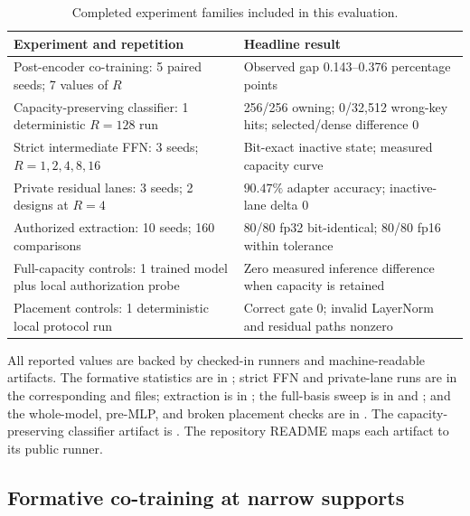 \documentclass[11pt]{article}
\begin{document}
\begin{table}[ht]
\centering
\caption{Completed experiment families included in this evaluation.}
\label{tab:evidence-map}
\small
\begin{tabularx}{\textwidth}{@{}p{}X@{}}
\toprule
Experiment and repetition & Headline result \\
\midrule
Post-encoder co-training: 5 paired seeds; 7 values of $R$ &
Observed gap 0.143--0.376 percentage points \\
Capacity-preserving classifier: 1 deterministic $R=128$ run &
256/256 owning; 0/32,512 wrong-key hits; selected/dense difference 0 \\
Strict intermediate FFN: 3 seeds; $R=1,2,4,8,16$ &
Bit-exact inactive state; measured capacity curve \\
Private residual lanes: 3 seeds; 2 designs at $R=4$ &
$90.47\%$ adapter accuracy; inactive-lane delta 0 \\
Authorized extraction: 10 seeds; 160 comparisons &
80/80 fp32 bit-identical; 80/80 fp16 within tolerance \\
Full-capacity controls: 1 trained model plus local authorization probe &
Zero measured inference difference when capacity is retained \\
Placement controls: 1 deterministic local protocol run &
Correct gate 0; invalid LayerNorm and residual paths nonzero \\
\bottomrule
\end{tabularx}
\end{table}

All reported values are backed by checked-in runners and machine-readable
artifacts. The formative statistics are in
; strict FFN and
private-lane runs are in the corresponding
 and
 files; extraction is in
; the full-basis sweep is in
 and
; and the whole-model, pre-MLP, and broken
placement checks are in
. The
capacity-preserving classifier artifact is
. The repository README maps
each artifact to its public runner.

\subsection{Formative co-training at narrow supports}
\end{document}
